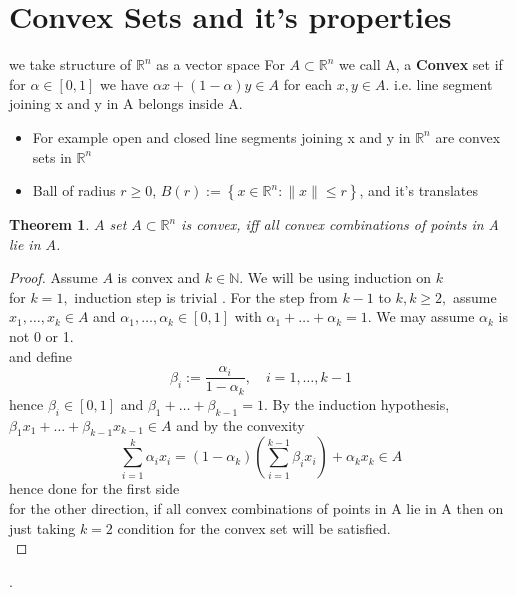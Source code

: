 \documentclass[oneside]{book}
\newtheorem{theorem}{Theorem}[section]
\begin{document}
\section{Convex Sets and it's properties } \label{s:4}
we take structure of  $\mathbb{R}^n$ as a vector space 
For $ A \subset \mathbb{R}^n$ we call A, a \textbf{Convex} set  if for $\alpha \in [0,1]$ we have $\alpha x +(1- \alpha)y \in A $ for each  $x, y \in A.$  i.e. line segment joining x and y in A belongs inside A.\\
\begin{itemize}
    \item  For example open and closed line segments joining x and y in $\mathbb{R}^n$ are convex sets in $\mathbb{R}^n$

\item  

 Ball of radius $r \geq 0$,  $B (r):=\left\{x \in \mathbb{R}^{n}:\|x\| \leq r\right\}$,  and it's translates
 
 \end{itemize}

 
\begin{theorem}
\label{t:4.5}
$A$ set $A \subset \mathbb{R}^{n}$ is convex, iff  all convex combinations of points in A lie
in $A$.
\end{theorem}

\begin{proof}

 Assume $A$ is convex and $k \in \mathbb{N} .$ We will be using induction on $k$ \\ for $k=1,$ induction step is trivial  . For the step from $k-1$ to $k, k \geq 2,$ assume $x_{1}, \ldots, x_{k} \in A$ and $\alpha_{1}, \ldots, \alpha_{k} \in[0,1]$ with $\alpha_{1}+\ldots+\alpha_{k}=1 .$ We may assume $\alpha_{k}$ is not 0 or 1.\\ and define 
$$
\beta_{i}:=\frac{\alpha_{i}}{1-\alpha_{k}}, \quad i=1, \ldots, k-1
$$
hence $\beta_{i} \in[0,1]$ and $\beta_{1}+\ldots+\beta_{k-1}=1 .$ By the induction hypothesis, $\beta_{1} x_{1}+\ldots+\beta_{k-1} x_{k-1} \in A$
and by the convexity
$$
\sum_{i=1}^{k} \alpha_{i} x_{i}=\left(1-\alpha_{k}\right)\left(\sum_{i=1}^{k-1} \beta_{i} x_{i}\right)+\alpha_{k} x_{k} \in A
$$
hence done for the first side\\
for the other direction, if all convex combinations of points in A lie in A then on just taking $k =2$ condition for the convex set will be satisfied.\\

\end{proof}.
\end{document}
